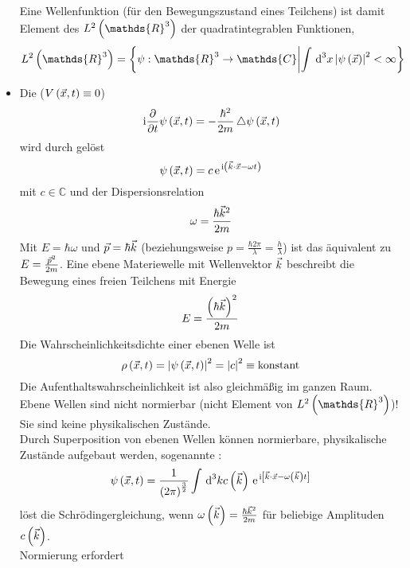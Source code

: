\begin{itemize}
  Eine Wellenfunktion (für den Bewegungszustand eines Teilchens) ist damit Element des  $L^2\of{\mathds{R}^3}$ der quadratintegrablen Funktionen,
  \begin{equation}
    L^2\of{\mathds{R}^3} = \setProp{\psi : \mathds{R}^3 \to \mathds{C}}{\int \dn{x}{3} \Norm{\psi\of{\vX}}^2 < \infty}
  \end{equation}
  \item Die  ($V\of{\vX,t} \equiv 0$)
  \begin{equation}
    \mI \ppv{}{t}\psi\of{\vX,t} = - \frac{\hbar^2}{2 m} \Laplace \psi\of{\vX,t}
  \end{equation}
  wird durch  gelöst
  \begin{equation}
    \psi\of{\vX,t} = c \e{\mI\norBra{\vK\cdot\vX - \omega t}}
  \end{equation}
  mit $c \in \mathds{C}$ und der Dispersionsrelation
  \begin{equation}
    \omega = \frac{\hbar \vK^2}{2 m}
  \end{equation}
  Mit $E = \hbar \omega$ und $\vP = \hbar \vK$ (beziehungsweise $p = \frac{\hbar 2 \pi}{\lambda} = \frac{h}{\lambda}$) ist das äquivalent zu $E = \frac{\vP^2}{2 m}$. Eine ebene Materiewelle mit Wellenvektor $\vK$ beschreibt die Bewegung eines freien Teilchens mit Energie
  \begin{equation}
    E = \frac{\norBra{\hbar\vK}^2}{2 m}
  \end{equation}
  Die Wahrscheinlichkeitsdichte einer ebenen Welle ist
  \begin{equation}
    \rho\of{\vX,t} = \Norm{\psi\of{\vX,t}}^2 = \Norm{c}^2 \equiv \text{konstant}
  \end{equation}
  Die Aufenthaltswahrscheinlichkeit ist also gleichmäßig im ganzen Raum. Ebene Wellen sind nicht normierbar (nicht Element von $L^2\of{\mathds{R}^3}$)! Sie sind keine physikalischen Zustände.\\
  Durch Superposition von ebenen Wellen können normierbare, physikalische Zustände aufgebaut werden, sogenannte :
  \begin{equation}
    \psi\of{\vX,t} = \frac{1}{\norBra{2\pi}^\frac{3}{2}}\int \dn{k}{3} c\of{\vK} \e{\mI\edgBra{\vK\cdot\vX-\omega\of{\vK} t}}
  \end{equation}
  löst die Schrödingergleichung, wenn $\omega\of{\vK} = \frac{\hbar\vK^2}{2m}$ für beliebige Amplituden $c\of{\vK}$.\\
  Normierung erfordert

\end{itemize}
